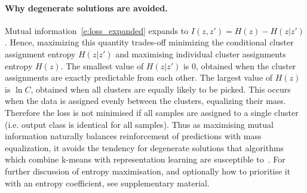 
  
\paragraph{Why degenerate solutions are avoided.}\label{s:equalization}

Mutual information~\eqref{e:loss_expanded} expands to
$
I(z,z')
=
H(z) - H(z|z')
$.
Hence, maximizing this quantity trades-off minimizing the conditional cluster assignment entropy $H(z|z')$ and maximising individual cluster assignments entropy $H(z)$.
The smallest value of $H(z|z')$ is 0, obtained when the cluster assignments are exactly predictable from each other.
The largest value of $H(z)$ is $\ln C$, obtained when all clusters are equally likely to be picked. This occurs when the data is assigned evenly between the clusters, equalizing their mass. Therefore the loss is not minimised if all samples are assigned to a single cluster (i.e. output class is identical for all samples).
Thus as maximising mutual information naturally balances reinforcement of predictions with mass equalization, it avoids the tendency for degenerate solutions that algorithms which combine k-means with representation learning are susceptible to~\cite{caron2018deep}.
For further discussion of entropy maximisation, and optionally how to prioritise it with an entropy coefficient, see supplementary material.

\begin{comment}
Equalization is controlled via the parameter $\lambda$, as can be seen by expanding~\eqref{e:loss_expanded}:
\begin{equation}\label{e:mi2}
  I_\lambda(z,z') = I_1(z,z') + (\lambda - 1) \cdot (H(z) + H(z')).
\end{equation} 
Whilst the default value of 1 usually works well, setting $\lambda > 1$ places more emphasis on equalization and in some cases provides a boost of 10\% accuracy~(\cref{t:iid_seg_lambda}).
\end{comment}

